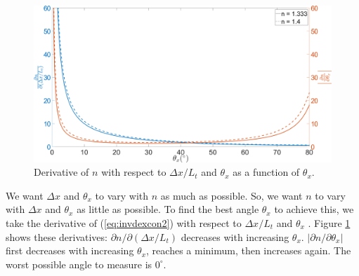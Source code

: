 \documentclass{svjour3}                     %
\begin{document}
%

\begin{figure}[hpbt]
	\includegraphics[width=\textwidth, keepaspectratio]{diffnsimple.png}
	\caption{Derivative of $n$ with respect to $\Delta x / L_t$ and $\theta_x$ as a function of $\theta_x$.}		
	\label{fig:diffnsimple}
\end{figure}

We want $\Delta x$ and $\theta_x$ to vary with $n$ as much as possible. So, we want $n$ to vary with $\Delta x$ and $\theta_x$ as little as possible. To find the best angle $\theta_x$ to achieve this, we take the derivative of (\ref{eq:invdexcon2}) with respect to $\Delta x/L_t$ and $\theta_x$ \cite{nemoto1992measurement}. Figure \ref{fig:diffnsimple} shows these derivatives: $\partial n/\partial (\Delta x/L_t)$ decreases with increasing $\theta_x$. $\left|\partial n/\partial \theta_x\right|$ first decreases with increasing $\theta_x$, reaches a minimum, then increases again. The worst possible angle to measure is $0^\circ$. 

\end{document}
